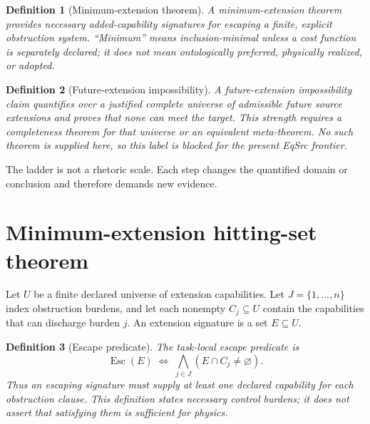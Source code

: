 \documentclass[11pt]{article}
\newtheorem{definition}{Definition}
\begin{document}
\begin{definition}[Minimum-extension theorem]
A minimum-extension theorem provides necessary added-capability signatures for
escaping a finite, explicit obstruction system.  ``Minimum'' means
inclusion-minimal unless a cost function is separately declared; it does not
mean ontologically preferred, physically realized, or adopted.
\end{definition}

\begin{definition}[Future-extension impossibility]
A future-extension impossibility claim quantifies over a justified complete
universe of admissible future source extensions and proves that none can meet
the target.  This strength requires a completeness theorem for that universe
or an equivalent meta-theorem.  No such theorem is supplied here, so this
label is blocked for the present EqSrc frontier.
\end{definition}

The ladder is not a rhetoric scale.  Each step changes the quantified domain
or conclusion and therefore demands new evidence.

\section{Minimum-extension hitting-set theorem}

Let $U$ be a finite declared universe of extension capabilities.  Let
$J=\{1,\ldots,n\}$ index obstruction burdens, and let each nonempty
$C_j\subseteq U$ contain the capabilities that can discharge burden $j$.
An extension signature is a set $E\subseteq U$.

\begin{definition}[Escape predicate]
The task-local escape predicate is
\[
 \operatorname{Esc}(E)\;\Longleftrightarrow\;
 \bigwedge_{j\in J}(E\cap C_j\neq\varnothing).
\]
Thus an escaping signature must supply at least one declared capability for
each obstruction clause.  This definition states necessary control burdens;
it does not assert that satisfying them is sufficient for physics.
\end{definition}
\end{document}
